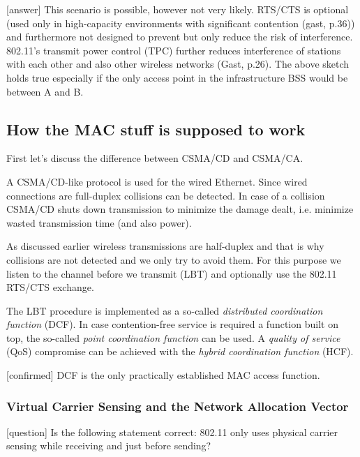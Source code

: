 \documentclass{article}
\begin{document}
	\bigskip
	\color{red}
	[answer] This scenario is possible, however not very likely. RTS/CTS is optional (used only in high-capacity environments with significant contention (gast, p.36)) and furthermore not designed to prevent but only reduce the risk of interference. 802.11's transmit power control (TPC) further reduces interference of stations with each other and also other wireless networks (Gast, p.26). The above sketch holds true especially if the only access point in the infrastructure BSS would be between A and B.
	\color{black}
	
	\subsection{How the MAC stuff is supposed to work}
	
	First let's discuss the difference between CSMA/CD and CSMA/CA.
	
	\medskip
	
	A CSMA/CD-like protocol is used for the wired Ethernet. Since wired connections are full-duplex collisions can be detected. In case of a collision CSMA/CD shuts down transmission to minimize the damage dealt, i.e. minimize wasted transmission time (and also power). 
	
	\medskip
	
	As discussed earlier wireless transmissions are half-duplex and that is why collisions are not detected and we only try to avoid them. For this purpose we listen to the channel before we transmit (LBT) and optionally use the 802.11 RTS/CTS exchange.
	
	\medskip
	
	The LBT procedure is implemented as a so-called \emph{distributed coordination function} (DCF). In case contention-free service is required a function built on top, the so-called \emph{point coordination function} can be used. A \emph{quality of service} (QoS) compromise can be achieved with the \emph{hybrid coordination function} (HCF).
	
	\medskip
	
	\color{red}
	[confirmed] DCF is the only practically established MAC access function.
	\color{black}
	
	\subsubsection{Virtual Carrier Sensing and the Network Allocation Vector}
	
	\color{blue}
	[question] Is the following statement correct: 802.11 only uses physical carrier sensing while receiving and just before sending?
	\color{black}
	
\end{document}
